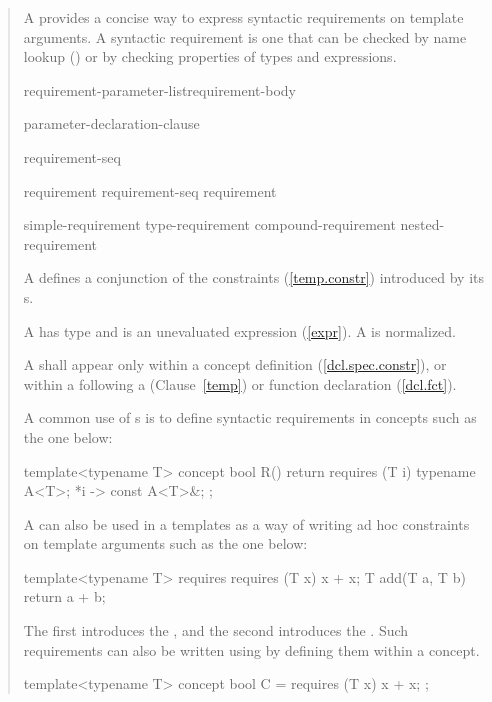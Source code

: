 \begin{quote}

\pnum
A  provides a concise way to express 
syntactic requirements on template arguments.
A syntactic requirement is one that can be checked by name lookup 
() or by checking properties of types and expressions.

\begin{bnf}
\br
     requirement-parameter-list\opt requirement-body

\br
    \terminal{(} parameter-declaration-clause\opt \terminal{)}
  
\br
    \terminal{\{} requirement-seq \terminal{\}}

\br
    requirement\br
    requirement-seq requirement

\br
    simple-requirement\br
    type-requirement\br
    compound-requirement\br
    nested-requirement
\end{bnf}

\pnum
A  defines a conjunction of the constraints 
(\ref{temp.constr}) introduced by its s.

\pnum
A  has type  and is an 
unevaluated expression (\ref{expr}).
\enternote
A  is normalized.
\exitnote

\pnum
A  shall appear
only within a concept definition (\ref{dcl.spec.constr}),
or within a  following a
(Clause~\ref{temp}) or function declaration (\ref{dcl.fct}).

\enterexample
A common use of s is to define
syntactic requirements in concepts such as the one below:
\begin{codeblock}
template<typename T>
  concept bool R() {
    return requires (T i) {
      typename A<T>;
      {*i} -> const A<T>&;
    };
  }
\end{codeblock}
A  can also be used in a 
 templates as a way of writing ad hoc 
constraints on template arguments such as the one below:
\begin{codeblock}
template<typename T>
  requires requires (T x) { x + x; }
    T add(T a, T b) { return a + b; }
\end{codeblock}
The first  introduces the 
, and the second
introduces the .
\exitexample
\enternote
Such requirements can also be written using by defining them within
a concept.
\begin{codeblock}
template<typename T>
  concept bool C = requires (T x) { x + x; };


\end{codeblock}
\end{quote}
